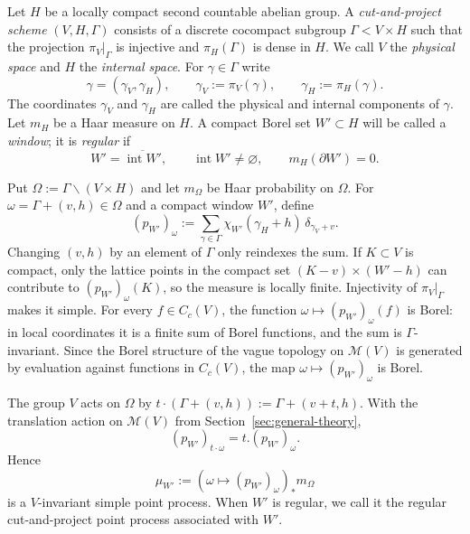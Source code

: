 \documentclass[11pt,reqno,a4paper]{amsart}
\numberwithin{equation}{section}
\theoremstyle{compact}
\theoremstyle{definition}
\theoremstyle{definition}
\newcommand{\cM}{\mathcal M}
\begin{document}
Let $H$ be a locally compact second countable abelian group.  A
\emph{cut-and-project scheme} $(V,H,\Gamma)$ consists of a discrete
cocompact subgroup $\Gamma<V\times H$ such that the projection
$\pi_V|_\Gamma$ is injective and $\pi_H(\Gamma)$ is dense in $H$.
We call $V$ the \emph{physical space} and $H$ the \emph{internal space}.
For $\gamma\in\Gamma$ write
\begin{equation}\label{eq:cap-star-notation}
  \gamma=(\gamma_V,\gamma_H),
  \qquad
  \gamma_V:=\pi_V(\gamma),
  \qquad
  \gamma_H:=\pi_H(\gamma).
\end{equation}
The coordinates $\gamma_V$ and $\gamma_H$ are called the physical and
internal components of $\gamma$.  Let $m_H$ be a Haar measure on $H$.  A
compact Borel set $W'\subset H$ will be called a \emph{window}; it is
\emph{regular} if
\begin{equation}\label{eq:cap-regular-window}
  W'=\overline{\operatorname{int}W'},
  \qquad
  \operatorname{int}W'\neq\varnothing,
  \qquad
  m_H(\partial W')=0.
\end{equation}

Put $\Omega:=\Gamma\backslash(V\times H)$ and let $m_\Omega$ be Haar
probability on $\Omega$.  For $\omega=\Gamma+(v,h)\in\Omega$ and a compact
window $W'$, define
\begin{equation}\label{eq:cap-process-definition}
  (p_{W'})_\omega
  :=\sum_{\gamma\in\Gamma}
    \chi_{W'}(\gamma_H+h)\,\delta_{\gamma_V+v}.
\end{equation}
Changing $(v,h)$ by an element of $\Gamma$ only reindexes the sum.  If
$K\subset V$ is compact, only the lattice points in the compact set
$(K-v)\times(W'-h)$ can contribute to $(p_{W'})_\omega(K)$, so the measure is
locally finite.  Injectivity of $\pi_V|_\Gamma$ makes it simple.  For every
$f\in C_c(V)$, the function $\omega\mapsto(p_{W'})_\omega(f)$ is Borel: in
local coordinates it is a finite sum of Borel functions, and the sum is
$\Gamma$-invariant.  Since the Borel structure of the vague topology on
$\cM(V)$ is generated by evaluation against functions in $C_c(V)$, the map
$\omega\mapsto(p_{W'})_\omega$ is Borel.

The group $V$ acts on $\Omega$ by
$t\cdot(\Gamma+(v,h)):=\Gamma+(v+t,h)$.  With the translation action on
$\cM(V)$ from Section~\ref{sec:general-theory},
\begin{equation}\label{eq:cap-equivariance}
  (p_{W'})_{t\cdot\omega}=t.(p_{W'})_\omega.
\end{equation}
Hence
\begin{equation}\label{eq:cap-haar-pushforward}
  \mu_{W'}:=(\omega\mapsto(p_{W'})_\omega)_*m_\Omega
\end{equation}
is a $V$-invariant simple point process.  When $W'$ is regular, we call it
the regular cut-and-project point process associated with $W'$.
\end{document}
